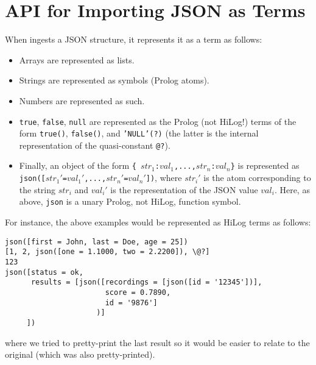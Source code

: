\section{API for Importing JSON  as Terms}

When \ERGO ingests a JSON structure, it represents it as a term as follows:
\begin{itemize}
\item  Arrays are represented as lists.
\item  Strings are represented as \ERGO symbols (Prolog atoms).
\item  Numbers are represented as such.
\item  \texttt{true}, \texttt{false}, \texttt{null} are represented as the
  Prolog (not HiLog!) terms of the form \texttt{true()},
  \texttt{false()}, and \texttt{'NULL'(?)} (the latter is the internal
  representation of the \FLSYSTEM quasi-constant \texttt{\bs{}@?}). 
\item Finally, an object of the form \texttt{\{
    $str_1$:$val_1$,...,$str_n$:$val_n$\}} is represented as
  \texttt{json([$str_1'$=$val_1'$,...,$str_n'$=$val_n'$])}, where
  $str_i'$ is the atom corresponding to the string $str_i$ and $val_i'$ is
  the \ERGO representation of the JSON value $val_i$.
  Here, as above, \texttt{json} is a unary Prolog, not HiLog, function
  symbol.
\end{itemize}
For instance, the above examples would be represented as HiLog 
\ERGO terms as follows:
\begin{verbatim}
json([first = John, last = Doe, age = 25])
[1, 2, json([one = 1.1000, two = 2.2200]), \@?]
123
json([status = ok,
      results = [json([recordings = [json([id = '12345'])],
                       score = 0.7890,
                       id = '9876']
                     )]
     ])
\end{verbatim}
where we tried to pretty-print the last result so it would be easier to
relate to the original (which was also pretty-printed).

